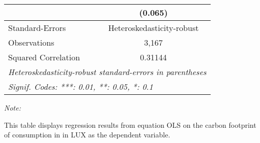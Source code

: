 \begin{table}[htbp!]
\begin{adjustbox}{width = 1\textwidth, max height = 0.95\textheight, center}
\begin{threeparttable}[b]
\begin{tabular}{lc}
                                & (0.065)\\   
            \midrule 
            Standard-Errors     & Heteroskedasticity-robust \\   
            Observations        & 3,167\\  
            Squared Correlation & 0.31144\\  
            \midrule \midrule
            \multicolumn{2}{l}{\emph{Heteroskedasticity-robust standard-errors in parentheses}}\\
            \multicolumn{2}{l}{\emph{Signif. Codes: ***: 0.01, **: 0.05, *: 0.1}}\\
         \end{tabular}
         
         \begin{tablenotes}\item \medskip \textit{Note:}
            \item This table displays regression results from equation OLS on the carbon footprint of consumption in  in LUX as the dependent variable.  
         \end{tablenotes}
      \end{threeparttable}
   \end{adjustbox}
\end{table}


